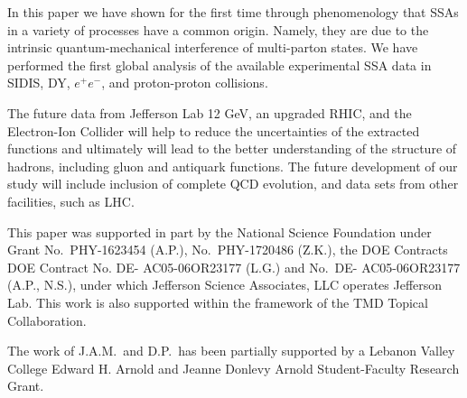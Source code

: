 \documentclass[twocolumn,prl,aps,superscriptaddress
               ,footinbib,amsfonts,amsmath,amssymb,showpacs]{revtex4-1}
\begin{document}
\vspace{0.1cm}
%
In this paper we have shown for the first time through phenomenology
that SSAs in a variety of processes have a common origin.  
%
Namely, they are due to the intrinsic quantum-mechanical interference
of multi-parton states. 
%
We have performed the first global analysis of the available
experimental SSA data in SIDIS, DY, $e^+e^-$, and proton-proton
collisions. 

The future data from Jefferson Lab 12 GeV, an upgraded RHIC, and the
Electron-Ion Collider will help to reduce the uncertainties of the
extracted functions and ultimately will lead to the better
understanding of the structure of hadrons, including gluon and
antiquark functions.
%
The future development of our study will include inclusion of complete
QCD evolution, and data sets from other facilities, such as LHC.

\vspace{0.1cm}
This paper was supported in part by the National Science Foundation under Grant No.~PHY-1623454 (A.P.), No.~PHY-1720486 (Z.K.), the DOE Contracts DOE Contract No. DE- AC05-06OR23177 (L.G.) and No.~DE- AC05-06OR23177 (A.P., N.S.), under which Jefferson Science Associates, LLC operates Jefferson Lab. This work is also supported within the framework of the TMD Topical
Collaboration.

The work of J.A.M.~and D.P.~has been partially supported by a Lebanon
Valley College Edward H. Arnold and Jeanne Donlevy Arnold
Student-Faculty Research Grant.



\end{document}
